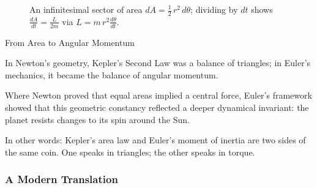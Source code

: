 \begin{figure}[H]
    \centering
    \caption{An infinitesimal sector of area \(dA = \tfrac12\,r^2\,d\theta\); dividing by \(dt\) shows \(\tfrac{dA}{dt} = \tfrac{L}{2m}\) via \(L = m\,r^2\frac{d\theta}{dt}\).}
    \label{fig:kepler-infinitesimal-sector}
\end{figure}








\begin{HistoricalSidebar}{From Area to Angular Momentum}

In Newton’s geometry, Kepler’s Second Law was a balance of triangles; in Euler’s mechanics, it became the balance 
of angular momentum.

\medskip

Where Newton proved that equal areas implied a central force, Euler’s framework showed that this geometric 
constancy reflected a deeper dynamical invariant: the planet resists changes to its spin around the Sun.

\medskip

In other words: Kepler’s area law and Euler’s moment of inertia are two sides of the same coin. One speaks in 
triangles; the other speaks in torque.

\end{HistoricalSidebar}



\subsubsection{A Modern Translation}

